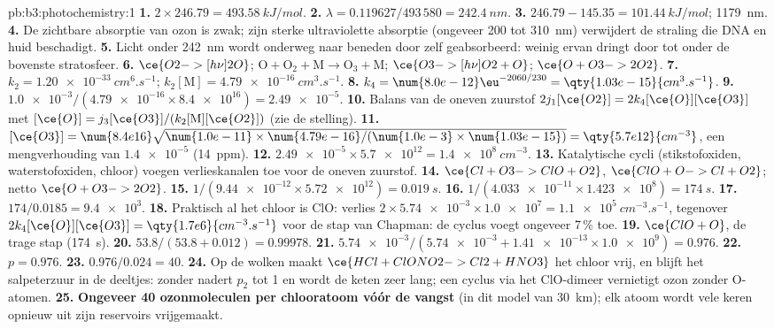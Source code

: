 \begin{solution}{pb:b3:photochemistry:1}
\textbf{1.} $2 \times 246.79 = \qty{493.58}{kJ/mol}$.
\textbf{2.} $\lambda = 0.119627/493\,580 = \qty{242.4}{nm}$.
\textbf{3.} $246.79 - 145.35 = \qty{101.44}{kJ/mol}$; \qty{1179}{nm}.
\textbf{4.} De zichtbare absorptie van ozon is zwak; zijn sterke
ultraviolette absorptie (ongeveer 200 tot \qty{310}{nm}) verwijdert de
straling die DNA en huid beschadigt.
\textbf{5.} Licht onder \qty{242}{nm} wordt onderweg naar beneden door
 zelf geabsorbeerd: weinig ervan dringt door tot onder de bovenste
stratosfeer.
\textbf{6.} $\ce{O2 ->[h\nu] 2 O}$; $\mathrm{O + O_2 + M \to O_3 + M}$; $\ce{O3 ->[h\nu] O2 + O}$; $\ce{O + O3 -> 2 O2}$.
\textbf{7.} $k_2 = \qty{1.20e-33}{cm^6.s^{-1}}$; $k_2[\mathrm M] = \qty{4.79e-16}{cm^3.s^{-1}}$.
\textbf{8.} $k_4 = \num{8.0e-12}\eu^{-2060/230} = \qty{1.03e-15}{cm^3.s^{-1}}$.
\textbf{9.} $\num{1.0e-3}/(\num{4.79e-16} \times \num{8.4e16}) = \num{2.49e-5}$.
\textbf{10.} Balans van de oneven zuurstof $2j_1[\ce{O2}] = 2k_4[\ce{O}][\ce{O3}]$ met $[\ce{O}] = j_3[\ce{O3}]/(k_2[\mathrm M][\ce{O2}])$ (zie de
stelling).
\textbf{11.} $[\ce{O3}] = \num{8.4e16}\sqrt{\num{1.0e-11} \times \num{4.79e-16}/(\num{1.0e-3} \times \num{1.03e-15})} =
\qty{5.7e12}{cm^{-3}}$, een mengverhouding van $\num{1.4e-5}$ (\qty{14}{ppm}).
\textbf{12.} $\num{2.49e-5} \times \num{5.7e12} = \qty{1.4e8}{cm^{-3}}$.
\textbf{13.} Katalytische cycli (stikstofoxiden, waterstofoxiden, chloor)
voegen verlieskanalen toe voor de oneven zuurstof.
\textbf{14.} $\ce{Cl + O3 -> ClO + O2}$, $\ce{ClO + O -> Cl + O2}$; netto $\ce{O + O3 -> 2 O2}$.
\textbf{15.} $1/(\num{9.44e-12} \times \num{5.72e12}) = \qty{0.019}{s}$.
\textbf{16.} $1/(\num{4.033e-11} \times \num{1.423e8}) = \qty{174}{s}$.
\textbf{17.} $174/0.0185 = \num{9.4e3}$.
\textbf{18.} Praktisch al het chloor is ClO: verlies $2 \times \num{5.74e-3} \times \num{1.0e7} = \qty{1.1e5}{cm^{-3}.s^{-1}}$,
tegenover $2k_4[\ce{O}][\ce{O3}] = \qty{1.7e6}{cm^{-3}.s^{-1}}$ voor de
stap van Chapman: de cyclus voegt ongeveer 7\,\% toe.
\textbf{19.} $\ce{ClO + O}$, de trage stap (\qty{174}{s}).
\textbf{20.} $53.8/(53.8 + 0.012) = 0.99978$.
\textbf{21.} $\num{5.74e-3}/(\num{5.74e-3} + \num{1.41e-13} \times \num{1.0e9}) = 0.976$.
\textbf{22.} $p = 0.976$.
\textbf{23.} $0.976/0.024 = 40$.
\textbf{24.} Op de wolken maakt $\ce{HCl + ClONO2 -> Cl2 + HNO3}$ het chloor
vrij, en blijft het salpeterzuur in de deeltjes: zonder  nadert
$p_2$ tot 1 en wordt de keten zeer lang; een cyclus via het ClO-dimeer
vernietigt ozon zonder O-atomen.
\textbf{25.} \textbf{Ongeveer 40 ozonmoleculen per chlooratoom vóór de
vangst} (in dit model van \qty{30}{km}); elk atoom wordt vele keren
opnieuw uit zijn reservoirs vrijgemaakt.
\end{solution}
